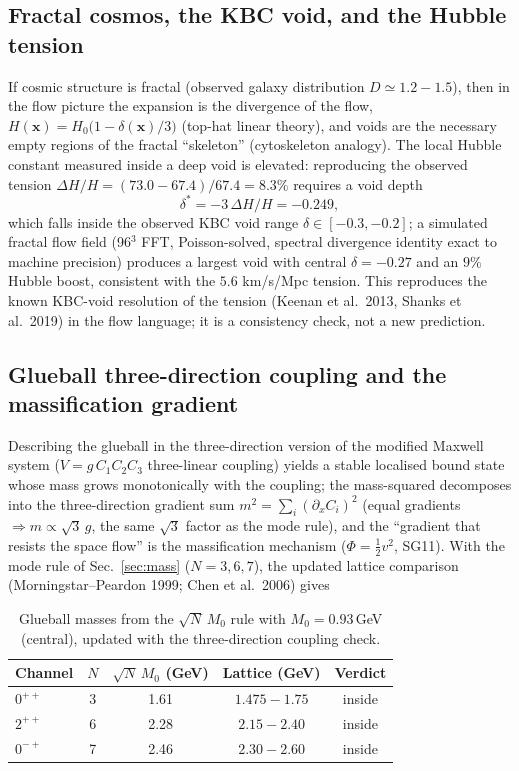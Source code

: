 \documentclass[aps,prd,preprint,superscriptaddress,amsmath,amssymb]{revtex4-2}
\begin{document}
\subsection{Fractal cosmos, the KBC void, and the Hubble tension}

If cosmic structure is fractal (observed galaxy distribution
$D\simeq1.2{-}1.5$), then in the flow picture the expansion is the
divergence of the flow, $H(\bm{x})=H_0\big(1-\delta(\bm{x})/3\big)$
(top-hat linear theory), and voids are the necessary empty regions of the
fractal ``skeleton'' (cytoskeleton analogy).  The local Hubble constant
measured inside a deep void is elevated: reproducing the observed tension
$\Delta H/H=(73.0-67.4)/67.4=8.3\%$ requires a void depth
\begin{equation}
\delta^* = -3\,\Delta H/H = -0.249 ,
\end{equation}
which falls inside the observed KBC void range
$\delta\in[-0.3,-0.2]$; a simulated fractal flow field (96$^3$ FFT,
Poisson-solved, spectral divergence identity exact to machine precision)
produces a largest void with central $\delta=-0.27$ and an $9\%$ Hubble
boost, consistent with the $5.6$ km/s/Mpc tension.  This reproduces the
known KBC-void resolution of the tension (Keenan et al.\ 2013, Shanks et
al.\ 2019) in the flow language; it is a consistency check, not a new
prediction.

\subsection{Glueball three-direction coupling and the massification gradient}

Describing the glueball in the three-direction version of the modified
Maxwell system ($V=g\,C_1C_2C_3$ three-linear coupling) yields a stable
localised bound state whose mass grows monotonically with the coupling;
the mass-squared decomposes into the three-direction gradient sum
$m^2=\sum_i(\partial_x C_i)^2$ (equal gradients $\Rightarrow
m\propto\sqrt3\,g$, the same $\sqrt3$ factor as the mode rule), and the
``gradient that resists the space flow'' is the massification mechanism
($\Phi=\tfrac12 v^2$, SG11).  With the mode rule of
Sec.~\ref{sec:mass} ($N=3,6,7$), the updated lattice comparison
(Morningstar--Peardon 1999; Chen et al.\ 2006) gives

\begin{table}[h]
\caption{Glueball masses from the $\sqrt{N}\,M_0$ rule with $M_0=0.93$\,GeV
(central), updated with the three-direction coupling check.}
\label{tab:glueball2}
\begin{ruledtabular}
\begin{tabular}{lcccc}
Channel & $N$ & $\sqrt{N}\,M_0$ (GeV) & Lattice (GeV) & Verdict \\
\hline
$0^{++}$ & 3 & 1.61 & $1.475{-}1.75$ & inside \\
$2^{++}$ & 6 & 2.28 & $2.15{-}2.40$ & inside \\
$0^{-+}$ & 7 & 2.46 & $2.30{-}2.60$ & inside \\
\end{tabular}
\end{ruledtabular}
\end{table}
\end{document}
